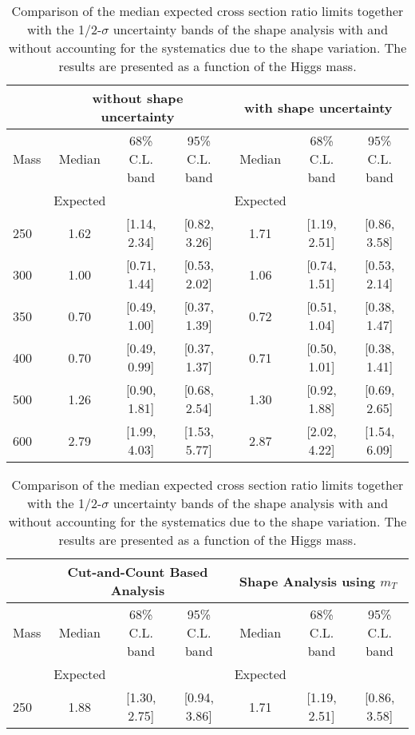 \begin{table}[!ht]
\begin{center}
{\normalsize
\begin{tabular}{|l|c|c|c|c|c|c|}
\hline
      &  \multicolumn{3}{c|}{ without shape uncertainty} &\multicolumn{3}{c|}{ with shape uncertainty} \\
\hline
Mass  &  Median      &     68\% C.L. band &  95\% C.L. band &  Median	   &	 68\% C.L. band &  95\% C.L. band\\
      &  Expected    &                    &                 &  Expected    &			&		 \\
\hline
250 & 1.62 & [1.14, 2.34] & [0.82, 3.26] & 1.71 & [1.19, 2.51] & [0.86, 3.58] \\
300 & 1.00 & [0.71, 1.44] & [0.53, 2.02] & 1.06 & [0.74, 1.51] & [0.53, 2.14] \\
350 & 0.70 & [0.49, 1.00] & [0.37, 1.39] & 0.72 & [0.51, 1.04] & [0.38, 1.47] \\
400 & 0.70 & [0.49, 0.99] & [0.37, 1.37] & 0.71 & [0.50, 1.01] & [0.38, 1.41] \\
500 & 1.26 & [0.90, 1.81] & [0.68, 2.54] & 1.30 & [0.92, 1.88] & [0.69, 2.65] \\
600 & 2.79 & [1.99, 4.03] & [1.53, 5.77] & 2.87 & [2.02, 4.22] & [1.54, 6.09] \\
\hline
\end{tabular}
}
\caption{Comparison of the median expected cross section ratio limits together with the 1/2-$\sigma$ uncertainty bands of 
the shape analysis with and without accounting for the systematics due to the shape variation. 
The results are presented as a function of the Higgs mass. }
\label{tab:mva_mtshapewithwithout_hzz}
\end{center}
\begin{center}
{\normalsize
\begin{tabular}{|l|c|c|c|c|c|c|}
\hline
      &  \multicolumn{3}{c|}{Cut-and-Count Based Analysis} &\multicolumn{3}{c|}{Shape Analysis using $m_T$} \\
\hline
Mass  &  Median      &     68\% C.L. band &  95\% C.L. band &  Median	   &	 68\% C.L. band &  95\% C.L. band\\
      &  Expected    &                    &                 &  Expected    &			&		 \\
\hline
250 & 1.88 & [1.30, 2.75] & [0.94, 3.86] & 1.71 & [1.19, 2.51] & [0.86, 3.58] \\

\end{tabular}}
\end{center}
\end{table}
